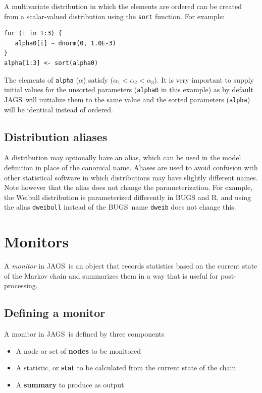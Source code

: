 \documentclass[11pt, a4paper, titlepage]{report}
\newcommand{\JAGS}{\textsf{JAGS}}
\newcommand{\BUGS}{\textsf{BUGS}}
\newcommand{\R}{\textsf{R}}
\begin{document}
A multivariate distribution in which the elements are ordered can be
created from a scalar-valued distribution using the \texttt{sort}
function. For example:
\begin{verbatim}
for (i in 1:3) {
   alpha0[i] ~ dnorm(0, 1.0E-3)
}
alpha[1:3] <- sort(alpha0)
\end{verbatim}
The elements of \texttt{alpha} ($\alpha$) satisfy ($\alpha_1 <
\alpha_2 < \alpha_3$). It is very important to supply initial values
for the unsorted parameters (\texttt{alpha0} in this example) as by
default \JAGS\ will initialize them to the same value and the sorted
parameters (\texttt{alpha}) will be identical instead of ordered.

\section{Distribution aliases}

A distribution may optionally have an alias, which can be used in the
model definition in place of the canonical name. Aliases are used to
avoid confusion with other statistical software in which distributions
may have slightly different names. Note however that the alias does
not change the parameterization. For example, the Weibull distribution
is parameterized differently in BUGS and \R, and using the alias
\texttt{dweibull} instead of the \BUGS\ name \texttt{dweib} does not
change this.

\chapter{Monitors}
\label{chapter:monitors}

A {\em monitor} in \JAGS\ is an object that records statistics based
on the current state of the Markov chain and summarizes them in a way
that is useful for post-processing.

\section{Defining a monitor}

A monitor in \JAGS\ is defined by three components
\begin{itemize}
\item A node or set of {\bf nodes} to be monitored
\item A statistic, or {\bf stat} to be calculated from the current
  state of the chain
\item A {\bf summary} to produce as output
\end{itemize}
\end{document}
